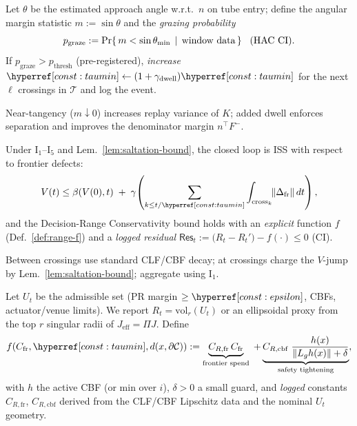 \begin{lemma}\label{lem:grazing}
\emph{}
Let $\theta$ be the estimated approach angle w.r.t.\ $n$ on tube entry; define the angular margin statistic $m:=\sin\theta$ and the \emph{grazing probability}
\[
p_{\mathrm{graze}}:=\Pr\{\,m<\sin\theta_{\min}\,\mid\,\text{window data}\,\} \;\;\; (\text{HAC CI}).
\]
If $p_{\mathrm{graze}}\!>\!p_{\mathrm{thresh}}$ (pre-registered), \emph{increase} $\constref{taumin}\leftarrow(1+\gamma_{\mathrm{dwell}})\constref{taumin}$ for the next $\ell$ crossings in $\mathcal T$ and log the event.
\begin{proofsketch}
Near-tangency ($m\!\downarrow\!0$) increases replay variance of $K$; added dwell enforces separation and improves the denominator margin $n^\top F^-$.
\end{proofsketch}
\end{lemma}

\begin{theorem}\label{thm:ISS2}
\emph{}
Under I$_1$--I$_5$ and Lem.~\ref{lem:saltation-bound}, the closed loop is ISS with respect to frontier defects:
\[
V(t)\le \beta\!\left(V(0),t\right)\;+\;\gamma\!\left(\sum_{k\le t/\constref{taumin}}\int_{\mathrm{cross}_k}\!\!\|\Delta_{\mathrm{fr}}\|\,dt\right),
\]
and the Decision-Range Conservativity bound holds with an \emph{explicit} function $f$ (Def.~\ref{def:range-f}) and a \emph{logged residual} $\mathsf{Res}_t:=\big(R_t-R_t'\big)-f(\cdot)\le 0$ (CI).
\begin{proofsketch}
Between crossings use standard CLF/CBF decay; at crossings charge the $V$-jump by Lem.~\ref{lem:saltation-bound}; aggregate using I$_1$.
\end{proofsketch}
\end{theorem}

\begin{definition}\label{def:range-f}
\emph{}
Let $U_t$ be the admissible set (PR margin $\ge\constref{epsilon}$, CBFs, actuator/venue limits).
We report $R_t=\mathrm{vol}_r(U_t)$ or an ellipsoidal proxy from the top $r$ singular radii of $J_{\mathrm{eff}}=\Pi J$.
Define
\[
f\!\left(C_{\mathrm{fr}},\constref{taumin},d(x,\partial\mathcal C)\right)
:=\underbrace{C_{R,\mathrm{fr}}\,C_{\mathrm{fr}}}_{\text{frontier spend}} \;+
\underbrace{C_{R,\mathrm{cbf}}\;\frac{h(x)}{\|L_g h(x)\|+\delta}}_{\text{safety tightening}},
\]
with $h$ the active CBF (or min over $i$), $\delta>0$ a small guard, and \emph{logged} constants $C_{R,\mathrm{fr}}$, $C_{R,\mathrm{cbf}}$ derived from the CLF/CBF Lipschitz data and the nominal $U_t$ geometry.
\end{definition}

